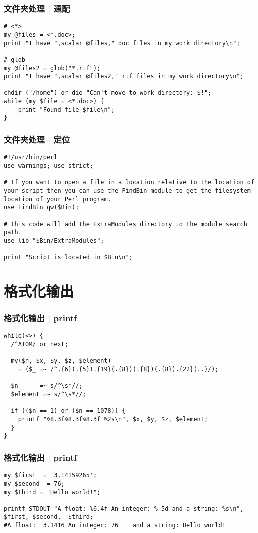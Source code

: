 \begin{frame}[fragile]
  \frametitle{文件夹处理 | 通配}
\begin{lstlisting}
# <*>
my @files = <*.doc>;
print "I have ",scalar @files," doc files in my work directory\n";

# glob
my @files2 = glob("*.rtf");
print "I have ",scalar @files2," rtf files in my work directory\n";

chdir ("/home") or die "Can't move to work directory: $!";
while (my $file = <*.doc>) {
    print "Found file $file\n";
}
\end{lstlisting}
\end{frame}

\begin{frame}[fragile]
  \frametitle{文件夹处理 | 定位}
\begin{lstlisting}
#!/usr/bin/perl
use warnings; use strict;

# If you want to open a file in a location relative to the location of your script then you can use the FindBin module to get the filesystem location of your Perl program.
use FindBin qw($Bin);

# This code will add the ExtraModules directory to the module search path.
use lib "$Bin/ExtraModules";

print "Script is located in $Bin\n";
\end{lstlisting}
\end{frame}

\section{格式化输出}
\begin{frame}[fragile]
  \frametitle{格式化输出 | printf}
\begin{lstlisting}
while(<>) {
  /^ATOM/ or next;

  my($n, $x, $y, $z, $element)
    = ($_ =~ /^.{6}(.{5}).{19}(.{8})(.{8})(.{8}).{22}(..)/);

  $n      =~ s/^\s*//;
  $element =~ s/^\s*//;

  if (($n == 1) or ($n == 1078)) {
    printf "%8.3f%8.3f%8.3f %2s\n", $x, $y, $z, $element;
  }
}
\end{lstlisting}
\end{frame}

\begin{frame}[fragile]
  \frametitle{格式化输出 | printf}
\begin{lstlisting}
my $first  = '3.14159265';
my $second  = 76;
my $third = "Hello world!";

printf STDOUT "A float: %6.4f An integer: %-5d and a string: %s\n", $first, $second,  $third;
#A float:  3.1416 An integer: 76    and a string: Hello world!
\end{lstlisting}
\end{frame}

